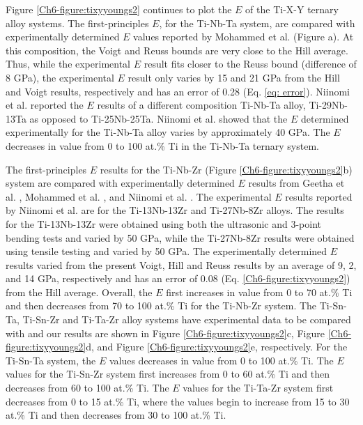 Figure \ref{Ch6-figure:tixyyoungs2} continues to plot the $E$ of the Ti-X-Y ternary alloy systems. The first-principles $E$, for the Ti-Nb-Ta system, are compared with experimentally determined $E$ values reported by Mohammed et al. \cite{Mohammed2014} (Figure \cite{Mohammed2014}a). At this composition, the Voigt and Reuss bounds are very close to the Hill average. Thus, while the experimental $E$ result fits closer to the Reuss bound (difference of 8 GPa), the experimental $E$ result only varies by 15 and 21 GPa from the Hill and Voigt results, respectively and has an error of 0.28 (Eq. \ref{eq: error}). Niinomi et al. \cite{Niinomi2012} reported the $E$ results of a different composition Ti-Nb-Ta alloy, Ti-29Nb-13Ta as opposed to Ti-25Nb-25Ta. Niinomi et al. \cite{Niinomi2012} showed that the $E$ determined experimentally for the Ti-Nb-Ta alloy varies by approximately 40 GPa. The $E$ decreases in value from 0 to 100 at.\% Ti in the Ti-Nb-Ta ternary system. 

The first-principles $E$ results for the Ti-Nb-Zr (Figure \ref{Ch6-figure:tixyyoungs2}b) system are compared with experimentally determined $E$ results from Geetha et al. \cite{Geetha2009},  Mohammed et al. \cite{Mohammed2014}, and Niinomi et al. \cite{Niinomi2012}. The experimental $E$ results reported by Niinomi et al. \cite{Niinomi2012} are for the Ti-13Nb-13Zr and Ti-27Nb-8Zr alloys. The results for the Ti-13Nb-13Zr were obtained using both the ultrasonic and 3-point bending tests and varied by 50 GPa, while the Ti-27Nb-8Zr results were obtained using tensile testing and varied by 50 GPa. The experimentally determined $E$ results varied from the present Voigt, Hill and Reuss results by an average of 9, 2, and 14 GPa, respectively and has an error of 0.08 (Eq. \ref{Ch6-figure:tixyyoungs2}) from the Hill average. Overall, the $E$ first increases in value from 0 to 70 at.\% Ti and then decreases from 70 to 100 at.\% Ti for the Ti-Nb-Zr system. The Ti-Sn-Ta, Ti-Sn-Zr and Ti-Ta-Zr alloy systems have experimental data to be compared with and our results are shown in Figure \ref{Ch6-figure:tixyyoungs2}c, Figure \ref{Ch6-figure:tixyyoungs2}d, and Figure \ref{Ch6-figure:tixyyoungs2}e, respectively. For the Ti-Sn-Ta system, the $E$ values decreases in value from 0 to 100 at.\% Ti. The $E$ values for the Ti-Sn-Zr system first increases from 0 to 60 at.\% Ti and then decreases from 60 to 100 at.\% Ti. The $E$ values for the Ti-Ta-Zr system first decreases from 0 to 15 at.\% Ti, where the values begin to increase from 15 to 30 at.\% Ti and then decreases from 30 to 100 at.\% Ti. 

